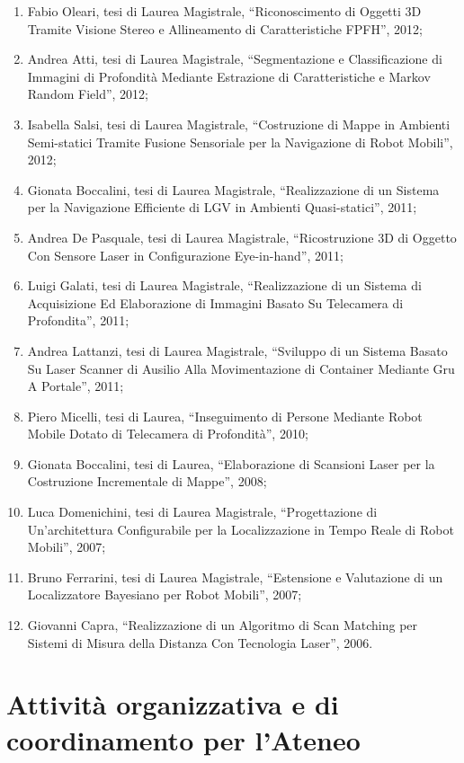 \documentclass[11pt]{article}
\begin{document}
\begin{enumerate}
%
\item Fabio Oleari, tesi di Laurea Magistrale, ``Riconoscimento di Oggetti 3D Tramite Visione Stereo e Allineamento di Caratteristiche FPFH'', 2012;
\item Andrea Atti, tesi di Laurea Magistrale, ``Segmentazione e Classificazione di Immagini di Profondit\`a Mediante Estrazione di Caratteristiche e Markov Random Field'', 2012;
\item Isabella Salsi, tesi di Laurea Magistrale, ``Costruzione di Mappe in Ambienti Semi-statici Tramite Fusione Sensoriale per la Navigazione di Robot Mobili'', 2012;
%
\item Gionata Boccalini, tesi di Laurea Magistrale, ``Realizzazione di un Sistema per la Navigazione Efficiente di LGV in Ambienti Quasi-statici'', 2011;
\item Andrea De Pasquale, tesi di Laurea Magistrale, ``Ricostruzione 3D di Oggetto Con Sensore Laser in Configurazione Eye-in-hand'', 2011;
\item Luigi Galati, tesi di Laurea Magistrale, ``Realizzazione di un Sistema di Acquisizione Ed Elaborazione di Immagini Basato Su Telecamera di Profondita'', 2011;
\item Andrea Lattanzi, tesi di Laurea Magistrale, ``Sviluppo di un Sistema Basato Su Laser Scanner di Ausilio Alla Movimentazione di Container Mediante Gru A Portale'', 2011; 
%
\item Piero Micelli, tesi di Laurea, ``Inseguimento di Persone Mediante Robot Mobile Dotato di Telecamera di Profondit\`a'', 2010;
%
\item Gionata Boccalini, tesi di Laurea, ``Elaborazione di Scansioni Laser per la Costruzione Incrementale di Mappe'', 2008;
%
\item Luca Domenichini, tesi di Laurea Magistrale, ``Progettazione di Un’architettura Configurabile per la Localizzazione in Tempo Reale di Robot Mobili'', 2007;
\item Bruno Ferrarini, tesi di Laurea Magistrale, ``Estensione e Valutazione di un Localizzatore Bayesiano per Robot Mobili'', 2007;
%
\item Giovanni Capra, ``Realizzazione di un Algoritmo di Scan Matching per Sistemi di Misura della  Distanza Con Tecnologia Laser'', 2006. 
\end{enumerate}


\section{Attivit\`a organizzativa e di coordinamento per l'Ateneo}
\end{document}
